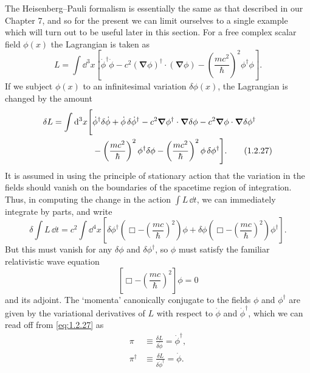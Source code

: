 The Heisenberg--Pauli formalism is essentially the same as that described in
our Chapter 7, and so for the present we can limit ourselves to a single
example which will turn out to be useful later in this section. For a free
complex scalar field $\phi(x)$ the Lagrangian is taken as
\begin{equation}
  L=\int \dd^3x\left[
    \dot\phi^{\dagger}\dot\phi
    -c^2(\boldsymbol\nabla\phi)^{\dagger}\cdot(\boldsymbol\nabla\phi)
    -\left(\frac{mc^2}{\hbar}\right)^2\phi^{\dagger}\phi
  \right].
  \tag{1.2.26}\label{eq:1.2.26}
\end{equation}
If we subject $\phi(x)$ to an infinitesimal variation $\delta\phi(x)$, the
Lagrangian is changed by the amount
\begin{align}
  \delta L=\int \mathop{}\!\mathrm{d}^3x\Bigg[
    &\dot\phi^{\dagger}\delta\dot\phi
    +\dot\phi\,\delta\dot\phi^{\dagger}
    -c^2\boldsymbol\nabla\phi^{\dagger}\cdot
      \boldsymbol\nabla\delta\phi
    -c^2\boldsymbol\nabla\phi\cdot
      \boldsymbol\nabla\delta\phi^{\dagger}
  \notag\\
    &-\left(\frac{mc^2}{\hbar}\right)^2\phi^{\dagger}\delta\phi
    -\left(\frac{mc^2}{\hbar}\right)^2\phi\,\delta\phi^{\dagger}
  \Bigg].
  \tag{1.2.27}\label{eq:1.2.27}
\end{align}
It is assumed in using the principle of stationary action that the variation
in the fields should vanish on the boundaries of the spacetime region of
integration. Thus, in computing the change in the action $\int L\,\dd t$, we can
immediately integrate by parts, and write
\[
  \delta\int L\,\dd t=c^2\int \dd^4x\left[
    \delta\phi^{\dagger}
      \left(\Box-\left(\frac{mc}{\hbar}\right)^2\right)\phi
    +\delta\phi
      \left(\Box-\left(\frac{mc}{\hbar}\right)^2\right)\phi^{\dagger}
  \right].
\]
But this must vanish for any $\delta\phi$ and $\delta\phi^{\dagger}$, so
$\phi$ must satisfy the familiar relativistic wave equation
\begin{equation}
  \left[\Box-\left(\frac{mc}{\hbar}\right)^2\right]\phi=0
  \tag{1.2.28}\label{eq:1.2.28}
\end{equation}
and its adjoint. The `momenta' canonically conjugate to the fields $\phi$ and
$\phi^{\dagger}$ are given by the variational derivatives of $L$ with respect
to $\dot\phi$ and $\dot\phi^{\dagger}$, which we can read off from \eqref{eq:1.2.27} as
\begin{align}
  \pi&\equiv\frac{\delta L}{\delta\dot\phi}=\dot\phi^{\dagger},
  \tag{1.2.29}\label{eq:1.2.29}\\
  \pi^{\dagger}&\equiv\frac{\delta L}{\delta\dot\phi^{\dagger}}=\dot\phi.
  \tag{1.2.30}\label{eq:1.2.30}
\end{align}
